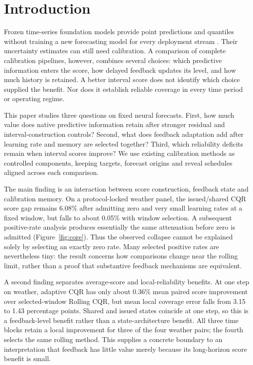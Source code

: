 \section{Introduction}
Frozen time-series foundation models provide point predictions and quantiles without
training a new forecasting model for every deployment stream
\citep{ansari2024chronos,das2024timesfm,ansari2025chronos2,liu2025moirai2}.
Their uncertainty estimates can still need calibration. A comparison of complete
calibration pipelines, however, combines several choices: which predictive information
enters the score, how delayed feedback updates its level, and how much history is
retained. A better interval score does not identify which choice supplied the benefit.
Nor does it establish reliable coverage in every time period or operating regime.

This paper studies three questions on fixed neural forecasts. First, how much value
does native predictive information retain after stronger residual and interval-construction
controls? Second, what does feedback adaptation add after learning rate and memory
are selected together? Third, which reliability deficits remain when interval scores
improve? We use existing calibration methods as controlled components, keeping targets,
forecast origins and reveal schedules aligned across each comparison.

The main finding is an interaction between score construction, feedback state and
calibration memory. On a protocol-locked weather panel, the issued/shared CQR score
gap remains 6.08\% after admitting zero and very small learning rates at a fixed
window, but falls to about 0.05\% with window selection. A subsequent positive-rate
analysis produces essentially the same attenuation before zero is admitted
(Figure~\ref{fig:core}). Thus the observed collapse cannot be explained solely by
selecting an exactly zero rate. Many selected positive rates are nevertheless tiny:
the result concerns how comparisons change near the rolling limit, rather than a
proof that substantive feedback mechanisms are equivalent.

A second finding separates average-score and local-reliability benefits. At one step
on weather, adaptive CQR has only about 0.36\% mean paired score improvement over
selected-window Rolling CQR, but mean local coverage error falls from 3.15 to 1.43
percentage points. Shared and issued states coincide at one step, so this is a
feedback-level benefit rather than a state-architecture benefit. All three time blocks
retain a local improvement for three of the four weather pairs; the fourth selects
the same rolling method. This supplies a concrete boundary to an interpretation
that feedback has little value merely because its long-horizon score benefit is small.

